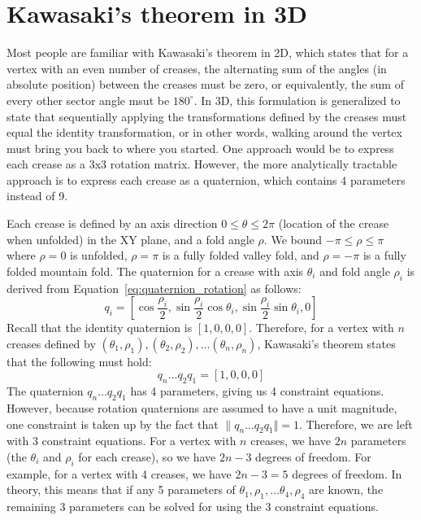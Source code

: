 \documentclass[11pt]{article}
\begin{document}
\section{Kawasaki's theorem in 3D}
Most people are familiar with Kawasaki's theorem in 2D, which states that for a vertex with an even number of creases, the alternating sum of the angles (in absolute position) between the creases must be zero, or equivalently, the sum of every other sector angle msut be $180^\circ$. In 3D, this formulation is generalized to state that sequentially applying the transformations defined by the creases must equal the identity transformation, or in other words, walking around the vertex must bring you back to where you started. One approach would be to express each crease as a 3x3 rotation matrix. However, the more analytically tractable approach is to express each crease as a quaternion, which contains 4 parameters instead of 9.

Each crease is defined by an axis direction $0\leq\theta\leq2\pi$ (location of the crease when unfolded) in the XY plane, and a fold angle $\rho$. We bound $-\pi \leq \rho \leq \pi$ where $\rho = 0$ is unfolded, $\rho = \pi$ is a fully folded valley fold, and $\rho = -\pi$ is a fully folded mountain fold. The quaternion for a crease with axis $\theta_i$ and fold angle $\rho_i$ is derived from Equation~\ref{eq:quaternion_rotation} as follows:
\begin{equation}
    q_i = \left[ \cos\frac{\rho_i}{2}, \sin\frac{\rho_i}{2}\cos\theta_i, \sin\frac{\rho_i}{2}\sin\theta_i, 0 \right]
\end{equation}
Recall that the identity quaternion is $[1, 0, 0, 0]$. Therefore, for a vertex with $n$ creases defined by $(\theta_1, \rho_1), (\theta_2, \rho_2), \ldots (\theta_n, \rho_n)$, Kawasaki's theorem states that the following must hold:
\begin{equation}
    q_n \ldots q_2 q_1 = [1, 0, 0, 0]
\end{equation}
The quaternion $q_n \ldots q_2 q_1$ has 4 parameters, giving us 4 constraint equations. However, because rotation quaternions are assumed to have a unit magnitude, one constraint is taken up by the fact that $\lVert q_n \ldots q_2 q_1 \Vert = 1$. Therefore, we are left with 3 constraint equations. For a vertex with $n$ creases, we have $2n$ parameters (the $\theta_i$ and $\rho_i$ for each crease), so we have $2n - 3$ degrees of freedom. For example, for a vertex with 4 creases, we have $2n - 3 = 5$ degrees of freedom. In theory, this means that if any 5 parameters of {$\theta_1, \rho_1, \ldots \theta_4, \rho_4$} are known, the remaining 3 parameters can be solved for using the 3 constraint equations. 
\end{document}
